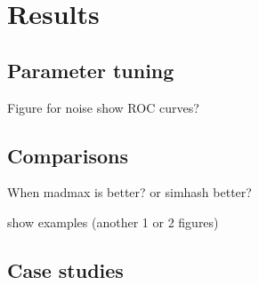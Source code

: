 \section{Results}

\subsection{Parameter tuning}

Figure for noise
show ROC curves?


\subsection{Comparisons}

When madmax is better? or simhash better?

show examples
 (another 1 or 2 figures)

\subsection{Case studies}
